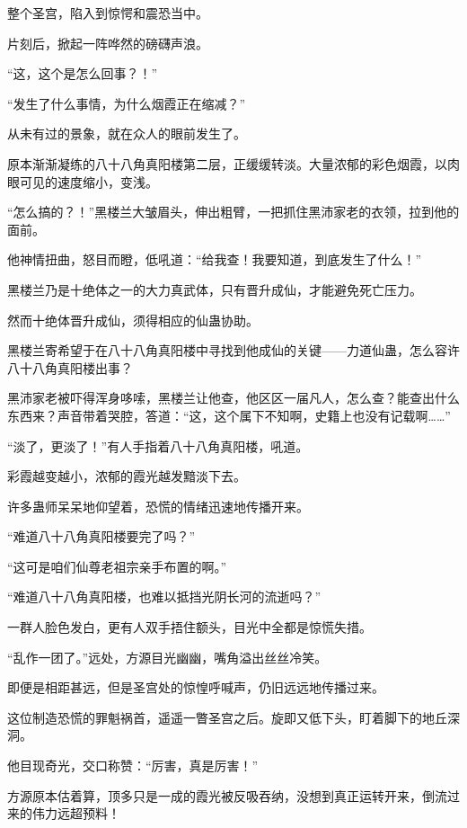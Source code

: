 
\begin{this_body}



整个圣宫，陷入到惊愕和震恐当中。

片刻后，掀起一阵哗然的磅礴声浪。

“这，这个是怎么回事？！”

“发生了什么事情，为什么烟霞正在缩减？”

从未有过的景象，就在众人的眼前发生了。

原本渐渐凝练的八十八角真阳楼第二层，正缓缓转淡。大量浓郁的彩色烟霞，以肉眼可见的速度缩小，变浅。

“怎么搞的？！”黑楼兰大皱眉头，伸出粗臂，一把抓住黑沛家老的衣领，拉到他的面前。

他神情扭曲，怒目而瞪，低吼道：“给我查！我要知道，到底发生了什么！”

黑楼兰乃是十绝体之一的大力真武体，只有晋升成仙，才能避免死亡压力。

然而十绝体晋升成仙，须得相应的仙蛊协助。

黑楼兰寄希望于在八十八角真阳楼中寻找到他成仙的关键——力道仙蛊，怎么容许八十八角真阳楼出事？

黑沛家老被吓得浑身哆嗦，黑楼兰让他查，他区区一届凡人，怎么查？能查出什么东西来？声音带着哭腔，答道：“这，这个属下不知啊，史籍上也没有记载啊……”

“淡了，更淡了！”有人手指着八十八角真阳楼，吼道。

彩霞越变越小，浓郁的霞光越发黯淡下去。

许多蛊师呆呆地仰望着，恐慌的情绪迅速地传播开来。

“难道八十八角真阳楼要完了吗？”

“这可是咱们仙尊老祖宗亲手布置的啊。”

“难道八十八角真阳楼，也难以抵挡光阴长河的流逝吗？”

一群人脸色发白，更有人双手捂住额头，目光中全都是惊慌失措。

“乱作一团了。”远处，方源目光幽幽，嘴角溢出丝丝冷笑。

即便是相距甚远，但是圣宫处的惊惶呼喊声，仍旧远远地传播过来。

这位制造恐慌的罪魁祸首，遥遥一瞥圣宫之后。旋即又低下头，盯着脚下的地丘深洞。

他目现奇光，交口称赞：“厉害，真是厉害！”

方源原本估着算，顶多只是一成的霞光被反吸吞纳，没想到真正运转开来，倒流过来的伟力远超预料！


\end{this_body}
